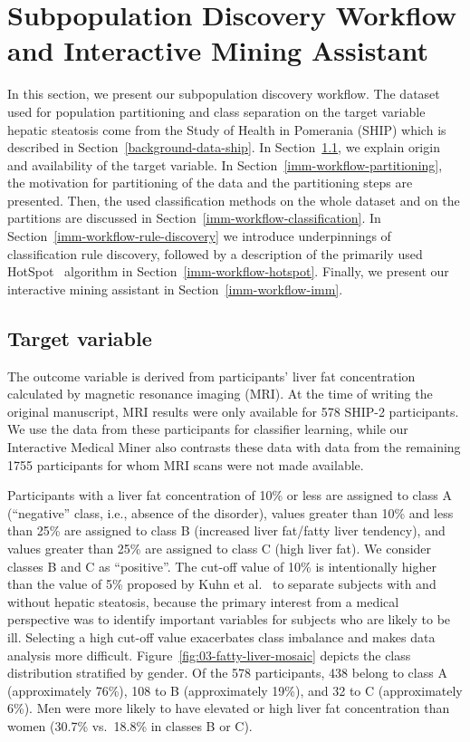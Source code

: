 \documentclass[
  oneside]{book}
\begin{document}
\hypertarget{imm-workflow}{%
\section{Subpopulation Discovery Workflow and Interactive Mining Assistant}\label{imm-workflow}}

In this section, we present our subpopulation discovery workflow.
The dataset used for population partitioning and class separation on the target variable hepatic steatosis come from the Study of Health in Pomerania (SHIP) which is described in Section~\ref{background-data-ship}.
In Section~\ref{imm-workflow-target}, we explain origin and availability of the target variable.
In Section~\ref{imm-workflow-partitioning}, the motivation for partitioning of the data and the partitioning steps are presented.
Then, the used classification methods on the whole dataset and on the partitions are discussed in Section~\ref{imm-workflow-classification}.
In Section~\ref{imm-workflow-rule-discovery} we introduce underpinnings of classification rule discovery, followed by a description of the primarily used HotSpot~\autocite{hotspot2012} algorithm in Section~\ref{imm-workflow-hotspot}.
Finally, we present our interactive mining assistant in Section~\ref{imm-workflow-imm}.

\hypertarget{imm-workflow-target}{%
\subsection{Target variable}\label{imm-workflow-target}}

The outcome variable is derived from participants' liver fat concentration calculated by magnetic resonance imaging (MRI).
At the time of writing the original manuscript, MRI results were only available for 578 SHIP-2 participants.
We use the data from these participants for classifier learning, while our Interactive Medical Miner also contrasts these data with data from the remaining 1755 participants for whom MRI scans were not made available.

Participants with a liver fat concentration of 10\% or less are assigned to class A (``negative'' class, i.e., absence of the disorder), values greater than 10\% and less than 25\% are assigned to class B (increased liver fat/fatty liver tendency), and values greater than 25\% are assigned to class C (high liver fat).
We consider classes B and C as ``positive''.
The cut-off value of 10\% is intentionally higher than the value of 5\% proposed by Kuhn et al.~\autocite{KuehnEtAl:2011} to separate subjects with and without hepatic steatosis, because the primary interest from a medical perspective was to identify important variables for subjects who are likely to be ill.
Selecting a high cut-off value exacerbates class imbalance and makes data analysis more difficult.
Figure~\ref{fig:03-fatty-liver-mosaic} depicts the class distribution stratified by gender.
Of the 578 participants, 438 belong to class A (approximately 76\%), 108 to B (approximately 19\%), and 32 to C (approximately 6\%).
Men were more likely to have elevated or high liver fat concentration than women (30.7\% vs.~18.8\% in classes B or C).
\end{document}
